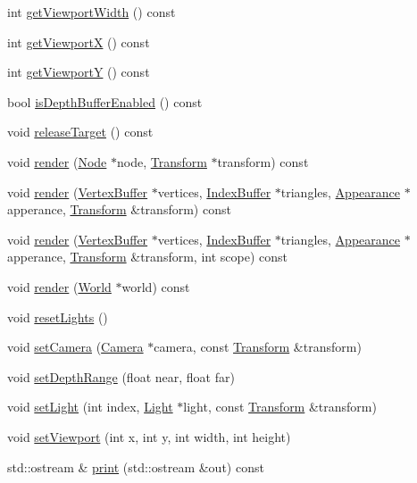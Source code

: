 \begin{CompactItemize}
int \hyperlink{classm3g_1_1Graphics3D_768e5c057e2fa4c4b17a67134abbf89f}{getViewportWidth} () const 
\item 
int \hyperlink{classm3g_1_1Graphics3D_af58b44cc6219f86c40dadb8a9377856}{getViewportX} () const 
\item 
int \hyperlink{classm3g_1_1Graphics3D_c21665afbf94a8f0153e099833c2b61a}{getViewportY} () const 
\item 
bool \hyperlink{classm3g_1_1Graphics3D_7f17c6781152840d42e756c27b0fb8c8}{isDepthBufferEnabled} () const 
\item 
void \hyperlink{classm3g_1_1Graphics3D_3ffaaf0d0f1e97a07c7f30c9b5a5dd32}{releaseTarget} () const 
\item 
void \hyperlink{classm3g_1_1Graphics3D_9c9ca78b3ce4cc358783a1a2701b9d85}{render} (\hyperlink{classm3g_1_1Node}{Node} $\ast$node, \hyperlink{classm3g_1_1Transform}{Transform} $\ast$transform) const 
\item 
void \hyperlink{classm3g_1_1Graphics3D_dc32291b31d6d3a32037eb9f727f73c0}{render} (\hyperlink{classm3g_1_1VertexBuffer}{VertexBuffer} $\ast$vertices, \hyperlink{classm3g_1_1IndexBuffer}{IndexBuffer} $\ast$triangles, \hyperlink{classm3g_1_1Appearance}{Appearance} $\ast$apperance, \hyperlink{classm3g_1_1Transform}{Transform} \&transform) const 
\item 
void \hyperlink{classm3g_1_1Graphics3D_9179d0d886a57cd3234b34f1b59dfc3c}{render} (\hyperlink{classm3g_1_1VertexBuffer}{VertexBuffer} $\ast$vertices, \hyperlink{classm3g_1_1IndexBuffer}{IndexBuffer} $\ast$triangles, \hyperlink{classm3g_1_1Appearance}{Appearance} $\ast$apperance, \hyperlink{classm3g_1_1Transform}{Transform} \&transform, int scope) const 
\item 
void \hyperlink{classm3g_1_1Graphics3D_8ef004c92d601203b8c697d441e7713f}{render} (\hyperlink{classm3g_1_1World}{World} $\ast$world) const 
\item 
void \hyperlink{classm3g_1_1Graphics3D_b8821ec231e8ebd939ae0feaaf138542}{resetLights} ()
\item 
void \hyperlink{classm3g_1_1Graphics3D_0df7bb61cfeba6626e20fd07ddd1c460}{setCamera} (\hyperlink{classm3g_1_1Camera}{Camera} $\ast$camera, const \hyperlink{classm3g_1_1Transform}{Transform} \&transform)
\item 
void \hyperlink{classm3g_1_1Graphics3D_6fc3837286f3516aa3320aeec9729495}{setDepthRange} (float near, float far)
\item 
void \hyperlink{classm3g_1_1Graphics3D_2bf83cb69f50117dd9d5548fe96d0ab0}{setLight} (int index, \hyperlink{classm3g_1_1Light}{Light} $\ast$light, const \hyperlink{classm3g_1_1Transform}{Transform} \&transform)
\item 
void \hyperlink{classm3g_1_1Graphics3D_0b4ec48e9c19060e9be5648c118c23b1}{setViewport} (int x, int y, int width, int height)
\item 
std::ostream \& \hyperlink{classm3g_1_1Graphics3D_6fea17fa1532df3794f8cb39cb4f911f}{print} (std::ostream \&out) const 
\end{CompactItemize}
